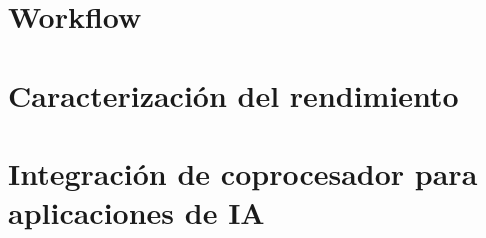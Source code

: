 \section{Workflow}

\label{Workf}

\section{Caracterización del rendimiento}

\label{Carac}

\section{Integración de coprocesador para aplicaciones de IA}

\label{Integ}


